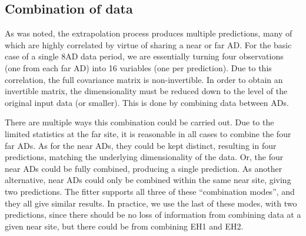 \documentclass[../thesis.tex]{subfiles}
\begin{document}
\begin{comment}
In the fit, we compare the far site measurement to the far site prediction as obtained from the near sites. Statistical uncertainty arises from both the near sites (in the form of fluctuations in the far site prediction) and from the far site data itself. We have the two expressions for each component.

Without affecting the fit, we can simplify the situation by assigning both components of the statistical uncertainty to the far site \emph{predictions}, with no error bars on the far site data.

The predictions at the same far AD, but from different near ADs, are statistically correlated via the statistical fluctuations at the far AD. The resulting covariance is the product of the two $\sigma_{\mathrm{far}}$.

Likewise, the predictions at different far ADs, but from the same near AD, are correlated via the fluctuations at the near AD. This gives a covariance of the product of the two $\sigma_{\mathrm{near}}$.

I don't know how to prove these claims about the covariances.

From this we can straightforwardly generalize to the full statistical covariance matrix across all ADs, energy bins, and data periods.
\end{comment}

\subsection{Combination of data}
\label{sec:fitCombo}

As was noted, the extrapolation process produces multiple predictions, many of which are highly correlated by virtue of sharing a near or far AD. For the basic case of a single 8AD data period, we are essentially turning four observations (one from each far AD) into 16 variables (one per prediction). Due to this correlation, the full covariance matrix is non-invertible. In order to obtain an invertible matrix, the dimensionality must be reduced down to the level of the original input data (or smaller). This is done by combining data between ADs.

There are multiple ways this combination could be carried out. Due to the limited statistics at the far site, it is reasonable in all cases to combine the four far ADs. As for the near ADs, they could be kept distinct, resulting in four predictions, matching the underlying dimensionality of the data. Or, the four near ADs could be fully combined, producing a single prediction. As another alternative, near ADs could only be combined within the same near site, giving two predictions. The fitter supports all three of these ``combination modes'', and they all give similar results. In practice, we use the last of these modes, with two predictions, since there should be no loss of information from combining data at a given near site, but there could be from combining EH1 and EH2.
\end{document}
